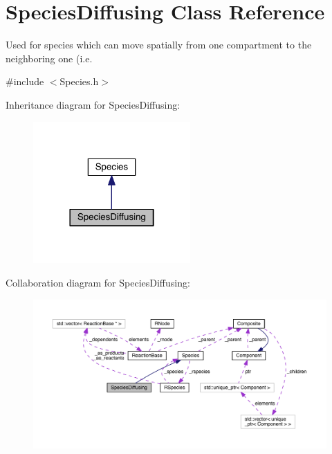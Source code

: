 \hypertarget{classSpeciesDiffusing}{\section{Species\+Diffusing Class Reference}
\label{classSpeciesDiffusing}
}


Used for species which can move spatially from one compartment to the neighboring one (i.\+e.  




{\ttfamily \#include $<$Species.\+h$>$}



Inheritance diagram for Species\+Diffusing\+:\nopagebreak
\begin{figure}[H]
\begin{center}
\leavevmode
\includegraphics[width=170pt]{classSpeciesDiffusing__inherit__graph}
\end{center}
\end{figure}


Collaboration diagram for Species\+Diffusing\+:
\nopagebreak
\begin{figure}[H]
\begin{center}
\leavevmode
\includegraphics[width=350pt]{classSpeciesDiffusing__coll__graph}
\end{center}
\end{figure}
